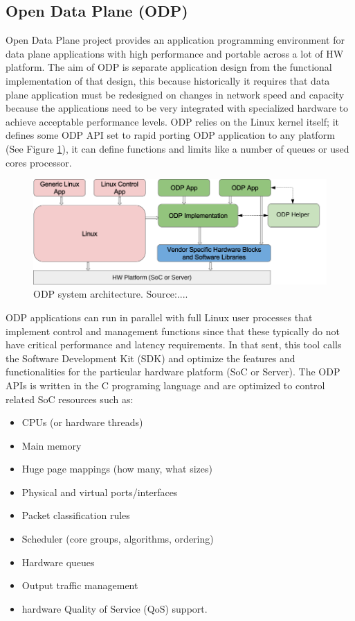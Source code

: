 \subsection{Open Data Plane (ODP)}
Open Data Plane project provides an application programming environment for data plane applications with high performance and portable across a lot of HW platform.
The aim of ODP is separate application design from the functional implementation of that design, this because historically it requires that data plane application must be redesigned on changes in network speed and capacity because the applications need to be very integrated with specialized hardware to achieve acceptable performance levels.
ODP relies on the Linux kernel itself; it defines some ODP API set to rapid porting ODP application to any platform (See Figure \ref{fig:sys_arch}), it can define functions and limits like a number of queues or used cores processor.\\
\begin{figure}[!ht]
	\centering
	\includegraphics[width=0.6\linewidth]
     {figures/odp-overview.png}
 	\caption{ODP system architecture. Source:....}
	\label{fig:sys_arch}
\end{figure}
ODP applications can run in parallel with full Linux user processes that implement control and management functions since that these typically do not have critical performance and latency requirements. In that sent, this tool calls the Software Development Kit (SDK) and optimize the features and functionalities for the particular hardware platform (SoC or Server).
The ODP APIs is written in the C programing language and are optimized to control related SoC resources such as:
\begin{itemize}
\item CPUs (or hardware threads) 
\item Main memory
\item Huge page mappings (how many, what sizes) 
\item Physical and virtual ports/interfaces 
\item Packet classification rules 
\item Scheduler (core groups, algorithms, ordering) 
\item Hardware queues 
\item Output traffic management 
\item hardware Quality of Service (QoS) support. 

\end{itemize}


